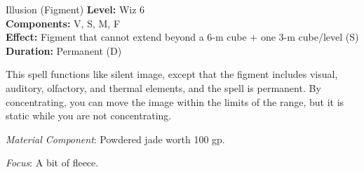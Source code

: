 {Illusion (Figment)}
{
	\textbf{Level:}
	Wiz 6\\
	\textbf{Components:}
	V, S, M, F\\
	\textbf{Effect:}
	Figment that cannot extend beyond a 6-m cube + one 3-m cube/level (S)\\
	\textbf{Duration:}
	Permanent (D)\\
}
{
	This spell functions like silent image, except that the figment includes visual, auditory, olfactory, and thermal elements, and the spell is permanent. By concentrating, you can move the image within the limits of the range, but it is static while you are not concentrating.

	\textit{Material Component}:
	 Powdered jade worth 100 gp.

	\textit{Focus}:
	A bit of fleece.

}
